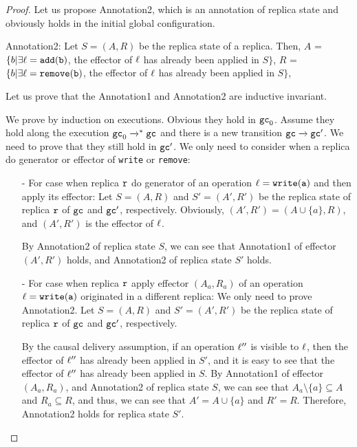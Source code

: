 \begin {proof}

Let us propose Annotation2, which is an annotation of replica state and obviously holds in the initial global configuration.

\noindent Annotation2: Let $S = (A,R)$ be the replica state of a replica. Then, $A$ =  $\{ b \vert \exists \alabel = \alabelshort[{\tt add}]{b}$, the effector of $\ell$ has already been applied in $S \}$,
    $R$ =  $\{ b \vert \exists \alabel = \alabelshort[{\tt remove}]{b}$, the effector of $\ell$ has already been applied in $S \}$,

Let us prove that the Annotation1 and Annotation2 are inductive invariant.

We prove by induction on executions. Obvious they hold in $\mathtt{gc}_0$. Assume they hold along the execution $\mathtt{gc}_0 \xrightarrow{}^* \mathtt{gc}$ and there is a new transition $\mathtt{gc} \xrightarrow{} \mathtt{gc}'$. We need to prove that they still hold in $\mathtt{gc}'$. We only need to consider when a replica do generator or effector of {\tt write} or {\tt remove}:

\begin{itemize}
\setlength{\itemsep}{0.5pt}
\item[-] For case when replica $\mathtt{r}$ do generator of an operation $\alabel = \alabelshort[{\tt write}]{a}$ and then apply its effector: Let $S=(A,R)$ and $S'=(A',R')$ be the replica state of replica $\mathtt{r}$ of $\mathtt{gc}$ and $\mathtt{gc}'$, respectively. Obviously, $(A',R') = (A \cup \{ a \},R)$, and $(A',R')$ is the effector of $\ell$.

        By Annotation2 of replica state $S$, we can see that Annotation1 of effector $(A',R')$ holds, and Annotation2 of replica state $S'$ holds.

\item[-] For case when replica $\mathtt{r}$ apply effector $(A_a,R_a)$ of an operation $\alabel = \alabelshort[{\tt write}]{a}$ originated in a different replica: We only need to prove Annotation2. Let $S=(A,R)$ and $S'=(A',R')$ be the replica state of replica $\mathtt{r}$ of $\mathtt{gc}$ and $\mathtt{gc}'$, respectively.

        By the causal delivery assumption, %
        if an operation $\ell''$ is visible to $\ell$, then the effector of $\ell''$ has already been applied in $S'$, and it is easy to see that the effector of $\ell''$ has already been applied in $S$. By Annotation1 of effector $(A_a,R_a)$, and Annotation2 of replica state $S$, we can see that $A_a \setminus \{ a \} \subseteq A$ and $R_a \subseteq R$, and thus, we can see that $A' = A \cup \{ a \}$ and $R' = R$. Therefore, Annotation2 holds for replica state $S'$.


\end{itemize}
\end{proof}
